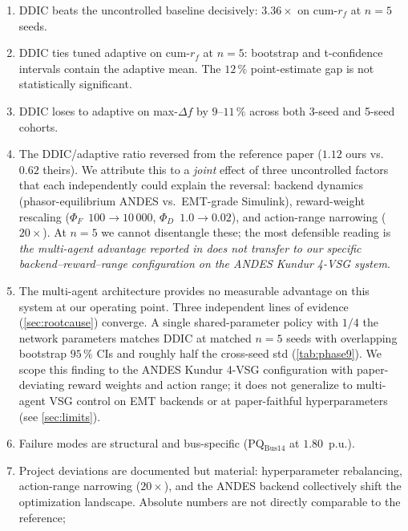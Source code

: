 \documentclass[journal,onecolumn,11pt]{IEEEtran}
\begin{document}
\begin{enumerate}
  \item DDIC beats the uncontrolled baseline decisively: $3.36\times$
        on cum-$r_f$ at $n = 5$ seeds.
  \item DDIC ties tuned adaptive on cum-$r_f$ at $n = 5$: bootstrap
        and t-confidence intervals contain the adaptive mean. The
        $12\,\%$ point-estimate gap is not statistically significant.
  \item DDIC loses to adaptive on max-$\Delta f$ by $9$--$11\,\%$
        across both 3-seed and 5-seed cohorts.
  \item The DDIC/adaptive ratio reversed from the reference paper
        ($1.12$ ours vs.\ $0.62$ theirs). We attribute this to a
        \emph{joint} effect of three uncontrolled factors that each
        independently could explain the reversal: backend dynamics
        (phasor-equilibrium ANDES vs.\ EMT-grade Simulink), reward-weight
        rescaling ($\Phi_F$~$100\rightarrow 10\,000$, $\Phi_D$~$1.0\rightarrow
        0.02$), and action-range narrowing ($20\times$). At $n = 5$
        we cannot disentangle these; the most defensible reading is
        \emph{the multi-agent advantage reported in
        \cite{yang2023ddic} does not transfer to our specific
        backend--reward--range configuration on the ANDES Kundur
        4-VSG system}.
  \item The multi-agent architecture provides no measurable
        advantage on this system at our operating point. Three
        independent lines of evidence (\cref{sec:rootcause}) converge.
        A single shared-parameter policy with $1/4$ the network
        parameters matches DDIC at matched $n = 5$ seeds with
        overlapping bootstrap $95\,\%$ CIs and roughly half the
        cross-seed std (\cref{tab:phase9}). We scope this finding to
        the ANDES Kundur 4-VSG configuration with paper-deviating
        reward weights and action range; it does not generalize to
        multi-agent VSG control on EMT backends or at paper-faithful
        hyperparameters (see \cref{sec:limits}).
  \item Failure modes are structural and bus-specific
        (PQ$_{\text{Bus14}}$ at $1.80$~p.u.).
  \item Project deviations are documented but material: hyperparameter
        rebalancing, action-range narrowing ($20\times$), and the
        ANDES backend collectively shift the optimization landscape.
        Absolute numbers are not directly comparable to the reference;

\end{enumerate}
\end{document}
